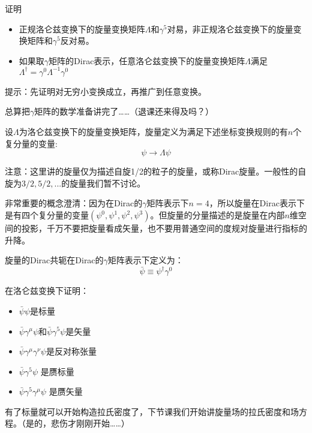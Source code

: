 \documentclass[CJK]{beamer}
\begin{document}
\begin{frame}
\bch
证明
\begin{itemize}
\item{正规洛仑兹变换下的旋量变换矩阵$\Lambda$和$\gamma^5$对易，非正规洛仑兹变换下的旋量变换矩阵和$\gamma^5$反对易。}
\item{如果取$\gamma$矩阵的Dirac表示，任意洛仑兹变换下的旋量变换矩阵$\Lambda$满足$\Lambda^\dagger = \gamma^0 \Lambda^{-1}\gamma^0$}
\end{itemize}

\skipline

提示：先证明对无穷小变换成立，再推广到任意变换。
\ech
\end{frame}


\begin{frame}
\bch

总算把$\gamma$矩阵的数学准备讲完了……（退课还来得及吗？）

\ech
\end{frame}




\begin{frame}
\bch
设$\Lambda$为洛仑兹变换下的旋量变换矩阵，旋量定义为满足下述坐标变换规则的有$n$个复分量的变量:
$$\psi \rightarrow \Lambda \psi$$

\skipline
注意：这里讲的旋量仅为描述自旋1/2的粒子的旋量，或称Dirac旋量。一般性的自旋为$3/2,5/2,...$的旋量我们暂不讨论。

\skipline
非常重要的概念澄清：因为在Dirac的$\gamma$矩阵表示下$n=4$，所以旋量在Dirac表示下是有四个复分量的变量$(\psi^0,\psi^1, \psi^2, \psi^3)$。但旋量的分量描述的是旋量在内部$n$维空间的投影，千万不要把旋量看成矢量，也不要用普通空间的度规对旋量进行指标的升降。
\ech
\end{frame}


\begin{frame}
\bch
旋量的Dirac共轭在Dirac的$\gamma$矩阵表示下定义为：
$$\bar\psi \equiv \psi^\dagger \gamma^0$$

在洛仑兹变换下证明：
\begin{itemize}
\item{$\bar\psi \psi$是标量}
\item{$\bar\psi\gamma^\mu\psi$和$\bar\psi\gamma^5\psi$是矢量}
\item{$\bar\psi\gamma^\mu\gamma^\nu\psi$是反对称张量}
\item{$\bar\psi\gamma^5\psi$ 是赝标量}
\item{$\bar\psi\gamma^5\gamma^\mu\psi$ 是赝矢量}
\end{itemize}

\ech
\end{frame}

\begin{frame}
\bch
有了标量就可以开始构造拉氏密度了，下节课我们开始讲旋量场的拉氏密度和场方程。（是的，悲伤才刚刚开始……）
\ech
\end{frame}
\end{document}
